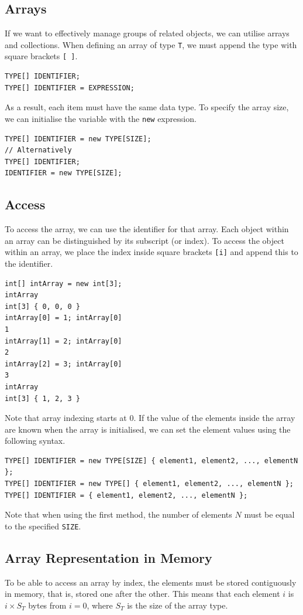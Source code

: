 \documentclass{article}
\def\customlinemarker#1#2{
    \edef\thelstnumber{%
        \unexpanded{%
            \ifnum#1=\value{lstnumber}\relax
              #2%
            \fi}%
        \ifx\thelstnumber\relax\else
        \expandafter\unexpanded\expandafter{\thelstnumber}%
        \fi
    }
}
\begin{document}
\subsection{Arrays}
If we want to effectively manage groups of related objects, we can utilise arrays and collections.
When defining an array of type \lstinline{T}, we must append the type with square brackets \lstinline{[ ]}.
\begin{lstlisting}[numbers=none]
TYPE[] IDENTIFIER;
TYPE[] IDENTIFIER = EXPRESSION;
\end{lstlisting}
As a result, each item must have the same data type. To specify the array size, we can initialise
the variable with the \lstinline{new} expression.
\begin{lstlisting}[numbers=none]
TYPE[] IDENTIFIER = new TYPE[SIZE];
// Alternatively
TYPE[] IDENTIFIER;
IDENTIFIER = new TYPE[SIZE];
\end{lstlisting}
\subsection{Access}
To access the array, we can use the identifier for that array. Each object within
an array can be distinguished by its subscript (or index). To access the object within
an array, we place the index inside square brackets \lstinline{[i]} and append this to the
identifier.
\begingroup
\let\thelstnumber\relax
\customlinemarker{1}{\$}
\customlinemarker{2}{\$}
\customlinemarker{4}{\$}
\customlinemarker{6}{\$}
\customlinemarker{8}{\$}
\customlinemarker{10}{\$}
\begin{lstlisting}
int[] intArray = new int[3]; 
intArray
int[3] { 0, 0, 0 }
intArray[0] = 1; intArray[0]
1
intArray[1] = 2; intArray[0]
2
intArray[2] = 3; intArray[0]
3
intArray
int[3] { 1, 2, 3 }
\end{lstlisting}
\endgroup
Note that array indexing starts at 0. If the value of the elements inside the array
are known when the array is initialised, we can set the element values using the following syntax.
\begin{lstlisting}[numbers=none]
TYPE[] IDENTIFIER = new TYPE[SIZE] { element1, element2, ..., elementN };
TYPE[] IDENTIFIER = new TYPE[] { element1, element2, ..., elementN };
TYPE[] IDENTIFIER = { element1, element2, ..., elementN };
\end{lstlisting}
Note that when using the first method, the number of elements \(N\) must be equal to the specified \lstinline{SIZE}. %
\subsection{Array Representation in Memory}
To be able to access an array by index, the elements must be stored contiguously in memory, that is,
stored one after the other. This means that each element \(i\) is \(i \times S_T\) bytes from \(i = 0\),
where \(S_T\) is the size of the array type.
\end{document}
